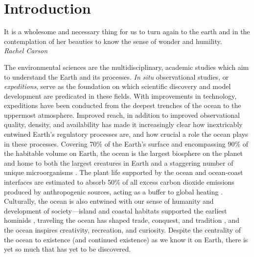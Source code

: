 \chapter{Introduction}
\label{chap:intro}

\begin{center}
    \begin{minipage}{0.7\textwidth}
      \begin{small}
       It is a wholesome and necessary thing for us to turn again to the earth and in the contemplation of her beauties to know the sense of wonder and humility.\\ \emph{Rachel Carson}
      \end{small}
    \end{minipage}
    \vspace{0.5cm}
\end{center}



The environmental sciences are the multidisciplinary, academic studies which aim to understand the Earth and its processes.
\emph{In situ} observational studies, or \emph{expeditions}, serve as the foundation on which scientific discovery and model development are predicated in these fields.
With improvements in technology, expeditions have been conducted from the deepest trenches of the ocean to the uppermost atmosphere.
Improved reach, in addition to improved observational quality, density, and availability has made it increasingly clear how inextricably entwined Earth's regulatory processes are, and how crucial a role the ocean plays in these processes.
Covering 70\% of the Earth's surface and encompassing 90\% of the habitable volume on Earth, the ocean is the largest biosphere on the planet and home to both the largest creatures in Earth and a staggering number of unique microorganisms \autocite{cario2019exploring,purkis2022remote}.
The plant life supported by the ocean and ocean-coast interfaces are estimated to absorb 50\% of all excess carbon dioxide emissions produced by anthropogenic sources, acting as a buffer to global heating \autocite{hori2019blue}.
Culturally, the ocean is also entwined with our sense of humanity and development of society---island and coastal habitats supported the earliest hominids \autocite{erlandson2006oceans}, traveling the ocean has shaped trade, conquest, and tradition \autocite{pearson2003indian,chaudhuri1985trade,firth2019understanding,nunn2003nature}, and the ocean inspires creativity, recreation, and curiosity.
Despite the centrality of the ocean to existence (and continued existence) as we know it on Earth, there is yet so much that has yet to be discovered.

